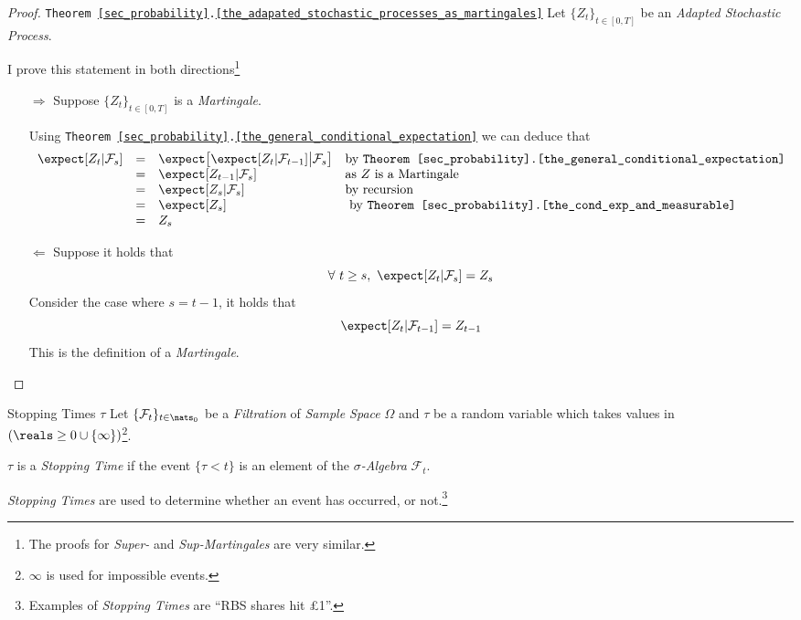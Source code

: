 \documentclass[11pt,a4paper]{article}
\begin{document}
  \begin{proof}{\texttt{Theorem \ref{sec_probability}.\ref{the_adapated_stochastic_processes_as_martingales}}}
    Let $\{Z_t\}_{t\in[0,T]}$ be an \textit{Adapted Stochastic Process}.
    \par I prove this statement in both directions\footnote{The proofs for \textit{Super-} and \textit{Sup-Martingales} are very similar.}
    \begin{itemize}
      \item[$\Longrightarrow$] Suppose $\{Z_t\}_{t\in[0,T]}$ is a \textit{Martingale}.
      \par Using \texttt{Theorem \ref{sec_probability}.\ref{the_general_conditional_expectation}} we can deduce that
      \[\begin{array}{rcll}
        \expect[Z_t|\mathcal{F}_s]&=&\expect\big[\expect[Z_t|\mathcal{F}_{t-1}]\big|\mathcal{F}_s\big]&\text{by \texttt{Theorem \ref{sec_probability}.\ref{the_general_conditional_expectation}}}\\
        &=&\expect[Z_{t-1}|\mathcal{F}_s]&\text{as }Z\text{ is a Martingale}\\
        &=&\expect[Z_s|\mathcal{F}_s]&\text{by recursion}\\
        &=&\expect[Z_s]&\text{ by \texttt{Theorem \ref{sec_probability}.\ref{the_cond_exp_and_measurable}} }\\
        &=&Z_s
      \end{array}\]
      \item[$\Longleftarrow$] Suppose it holds that
      \[ \forall\ t\geq s,\  \expect[Z_t|\mathcal{F}_s]=Z_s \]
      Consider the case where $s=t-1$, it holds that
      \[ \expect[Z_t|\mathcal{F}_{t-1}]=Z_{t-1} \]
      This is the definition of a \textit{Martingale}.
    \end{itemize}
    \proved
  \end{proof}

  \begin{definition}{Stopping Times $\tau$}
    Let $\{\mathcal{F}_t\}_{t\in\nats_0}$ be a \textit{Filtration} of \textit{Sample Space} $\Omega$ and $\tau$ be a random variable which takes values in $(\reals\geq0\cup\{\infty\})$\footnote{$\infty$ is used for impossible events.}.
    \par $\tau$ is a \textit{Stopping Time} if the event $\{\tau<t\}$ is an element of the \textit{$\sigma$-Algebra} $\mathcal{F}_t$.
    \par \textit{Stopping Times} are used to determine whether an event has occurred, or not.\footnote{Examples of \textit{Stopping Times} are ``RBS shares hit £1''.}
  \end{definition}
\end{document}
